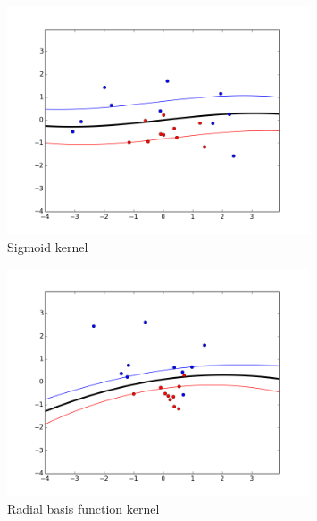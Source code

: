 \documentclass[a4paper]{article}
\begin{document}
\begin{figure}
\centering
\includegraphics[width=0.8\textwidth]{sigmoid_kernel.png}
\caption{\label{fig:sigmoid_kernel}Sigmoid kernel}
\end{figure}

\begin{figure}
\centering
\includegraphics[width=0.8\textwidth]{rbf_kernel.png}
\caption{\label{fig:rbf_kernel}Radial basis function kernel}
\end{figure}
\end{document}
